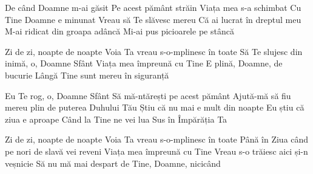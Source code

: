 
\beginverse
De când Doamne m-ai găsit
Pe acest pământ străin
Viața mea s-a schimbat
Cu Tine Doamne e minunat
Vreau să Te slăvesc mereu
Că ai lucrat în dreptul meu
M-ai ridicat din groapa adâncă
Mi-ai pus picioarele pe stâncă
\endverse

\beginchorus
Zi de zi, noapte de noapte
Voia Ta vreau s-o-mplinesc în toate
Să Te slujesc din inimă, o, Doamne Sfânt
Viața mea împreună cu Tine
E plină, Doamne, de bucurie
Lângă Tine sunt mereu în siguranță
\endchorus

\beginverse
Eu Te rog, o, Doamne Sfânt
Să mă-ntărești pe acest pământ
Ajută-mă să fiu mereu plin de puterea Duhului Tău
Știu că nu mai e mult din noapte
Eu știu că ziua e aproape
Când la Tine ne vei lua
Sus în Împărăția Ta
\endverse

\beginchorus
Zi de zi, noapte de noapte
Voia Ta vreau s-o-mplinesc în toate
Până în Ziua când pe nori de slavă vei reveni
Viața mea împreună cu Tine
Vreau s-o trăiesc aici și-n veșnicie
Să nu mă mai despart de Tine, Doamne, nicicând
\endchorus

\endsong
